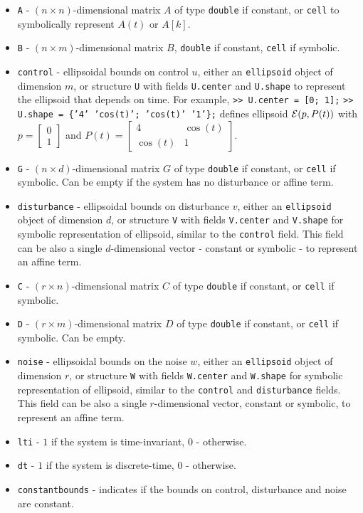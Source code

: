 \documentclass{report}
\newcommand{\EE}{{\cal E}}
\begin{document}
\begin{itemize}
\item {\tt A} - $(n\times n)$-dimensional matrix $A$ of type {\tt double}
if constant, or {\tt cell} to symbolically represent $A(t)$ or $A[k]$.
\item {\tt B} - $(n\times m)$-dimensional matrix $B$, {\tt double} if constant,
{\tt cell} if symbolic.
\item {\tt control} - ellipsoidal bounds on control $u$,
either an {\tt ellipsoid}
object of dimension $m$, or structure {\tt U} with fields {\tt U.center} and
{\tt U.shape} to represent the ellipsoid that depends on time. For example,
\newline
{\tt >> U.center = [0; 1];}
\newline
{\tt >> U.shape = \{'4' 'cos(t)'; 'cos(t)' '1'\};}
\newline
defines ellipsoid $\EE(p, P(t))$ with $p=\left[\begin{array}{c}
0\\
1\end{array}\right]$ and $P(t) = \left[\begin{array}{cc}
4 & \cos(t)\\
\cos(t) & 1\end{array}\right]$.
\item {\tt G} - $(n\times d)$-dimensional matrix $G$ of type {\tt double}
if constant, or {\tt cell} if symbolic. Can be empty if the system has
no disturbance or affine term.
\item {\tt disturbance} - ellipsoidal bounds on disturbance $v$, either an
{\tt ellipsoid} object of dimension $d$, or structure {\tt V} with
fields {\tt V.center} and {\tt V.shape} for symbolic representation of
ellipsoid, similar to the {\tt control} field.
This field can be also a single $d$-dimensional vector - constant or symbolic -
to represent an affine term.
\item {\tt C} - $(r\times n)$-dimensional matrix $C$ of type {\tt double}
if constant, or {\tt cell} if symbolic.
\item {\tt D} - $(r\times m)$-dimensional matrix $D$ of type {\tt double}
if constant, or {\tt cell} if symbolic. Can be empty.
\item {\tt noise} - ellipsoidal bounds on the noise $w$, either an
{\tt ellipsoid} object of dimension $r$, or structure {\tt W} with
fields {\tt W.center} and {\tt W.shape} for symbolic representation of
ellipsoid, similar to the {\tt control} and {\tt disturbance} fields.
\newline
This field can be also a single $r$-dimensional vector, constant or symbolic,
to represent an affine term.
\item {\tt lti} - $1$ if the system is time-invariant, $0$ - otherwise.
\item {\tt dt} - $1$ if the system is discrete-time, $0$ - otherwise.
\item {\tt constantbounds} - indicates if the bounds on control, disturbance
and noise are constant.
\end{itemize}
\end{document}
